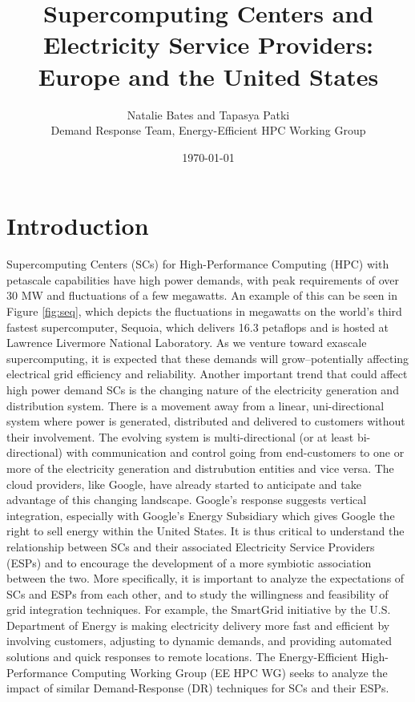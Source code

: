 \documentclass{article}
\title{Supercomputing Centers and Electricity Service Providers: Europe and the United States}
\author{Natalie Bates and Tapasya Patki \\ Demand Response Team, Energy-Efficient HPC Working Group}
\date{\today}
\begin{document}
\fontsize{10}{15}
\selectfont
\maketitle
\section{Introduction}

Supercomputing Centers (SCs) for High-Performance Computing (HPC) with petascale capabilities have high power demands, with peak requirements of over 30 MW and fluctuations of a few megawatts. An example of this can be seen in Figure \ref{fig:seq}, which depicts the fluctuations in megawatts on the world's third fastest supercomputer, Sequoia, which delivers 16.3 petaflops and is hosted at Lawrence Livermore National Laboratory. As we venture toward exascale supercomputing, it is expected that these demands will grow--potentially affecting electrical grid efficiency and reliability.  Another important trend that could affect high power demand SCs is the changing nature of the electricity generation and distribution system.  There is a movement away from a linear, uni-directional system where power is generated, distributed and delivered to customers without their involvement.  The evolving system is multi-directional (or at least bi-directional) with communication and control going from end-customers to one or more of the electricity generation and distrubution entities and vice versa.  The cloud providers, like Google, have already started to anticipate and take advantage of this changing landscape.  Google's response suggests vertical integration, especially with Google's Energy Subsidiary which gives Google the right to sell energy within the United States.  It is thus critical to understand the relationship between SCs and their associated Electricity Service Providers (ESPs) and to encourage the development of a more symbiotic association between the two. More specifically, it is important to analyze the expectations of SCs and ESPs from each other, and to study the willingness and feasibility of grid integration techniques. For example, the SmartGrid initiative \cite{SmartGrid} by the U.S. Department of Energy is making electricity delivery more fast and efficient by involving customers, adjusting to dynamic demands, and providing automated solutions and quick responses to remote locations. The Energy-Efficient High-Performance Computing Working Group (EE HPC WG) seeks to analyze the impact of similar Demand-Response (DR) techniques for SCs and their ESPs. 
\end{document}
